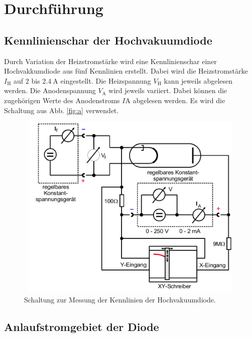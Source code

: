 \section{Durchführung}
\label{sec:Durchführung}

\subsection{Kennlinienschar der Hochvakuumdiode}
Durch Variation der Heizstromstärke wird eine Kennlinienschar 
einer Hochvakkumdiode aus fünf Kennlinien erstellt.
Dabei wird die Heizstromstärke $I_\text{H}$ auf $\num{2}$
bis $\SI{2.4}{\ampere}$ eingestellt.
Die Heizspannung $V_\text{H}$ kann jeweils abgelesen werden.
Die Anodenspannung $V_\text{A}$ wird jeweils variiert.
Dabei können die zugehörigen Werte des Anodenstroms $I\text{A}$
abgelesen werden. Es wird die Schaltung aus Abb. \ref{fig:a}
verwendet.
\begin{figure}
    \centering
    \includegraphics[width=12cm, height=9cm]{build/a.png}
    \caption{Schaltung zur Messung der Kennlinien der Hochvakuumdiode. \cite{V504}}
    \label{fig:c}
\end{figure}

\subsection{Anlaufstromgebiet der Diode}

